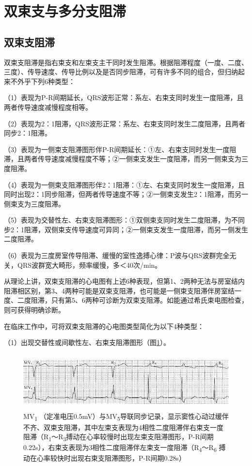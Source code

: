 \protect\hypertarget{text00028.htmlux5cux23subid349}{}{}

\section{双束支与多分支阻滞}

\protect\hypertarget{text00028.htmlux5cux23subid350}{}{}

\subsection{双束支阻滞}

双束支阻滞是指右束支和左束支主干同时发生阻滞。根据阻滞程度（一度、二度、三度）、传导速度、传导比例以及是否同步阻滞，可有许多不同的组合，但归纳起来不外乎下列6种类型：

（1）表现为P-R间期延长，QRS波形正常：系左、右束支同时发生一度阻滞，且两者传导速度减慢程度相等。

（2）表现为2：1阻滞，QRS波形正常：系左、右束支同时发生二度阻滞，且两者同步2：1阻滞。

（3）表现为一侧束支阻滞图形伴P-R间期延长：①左、右束支同时发生一度阻滞，且两者传导速度减慢程度不等；②一侧束支发生一度阻滞，而另一侧束支为三度阻滞。

（4）表现为一侧束支阻滞图形伴2：1阻滞：①左、右束支同时发生一度阻滞，且同时出现2：1同步阻滞，但两者传导速度不等；②一侧束支发生2：1阻滞，而另一侧束支为三度阻滞。

（5）表现为交替性左、右束支阻滞图形：①双侧束支同时发生二度阻滞，为不同步2：1阻滞，双侧束支传导速度可异同；②一侧束支发生一度阻滞，而另一侧发生二度阻滞。

（6）表现为三度房室传导阻滞、缓慢的室性逸搏心律：P波与QRS波群完全无关，QRS波群宽大畸形，频率缓慢，多＜40次/min。

从理论上讲，双束支阻滞的心电图有上述6种表现，但第1、2两种无法与房室结内阻滞相区别，第3、4两种可能是双束支阻滞，也可能是一侧束支阻滞伴房室结一度、二度阻滞，只有第5、6两种可诊断为双束支阻滞。如能通过希氏束电图检查，则可获得明确诊断。

在临床工作中，可将双束支阻滞的心电图类型简化为以下4种类型：

（1）出现交替性或间歇性左、右束支阻滞图形（图\ref{fig21-11}）。

\begin{figure}[!htbp]
 \centering
 \includegraphics[width=5.58333in,height=1.1875in]{./images/Image00359.jpg}
 \captionsetup{justification=centering}
 \caption{MV\textsubscript{1} （定准电压0.5mV）与MV\textsubscript{5}导联同步记录，显示窦性心动过缓伴不齐、双束支阻滞，其中左束支表现为4相性二度阻滞伴右束支一度阻滞（R\textsubscript{1}～R\textsubscript{3}搏动在心率较慢时出现左束支阻滞图形，P-R间期0.22s），右束支表现为3相性二度阻滞伴左束支一度阻滞（R\textsubscript{4}～R\textsubscript{6} 搏动在心率较快时出现右束支阻滞图形，P-R间期0.28s）}
 \label{fig21-11}
  \end{figure} 


